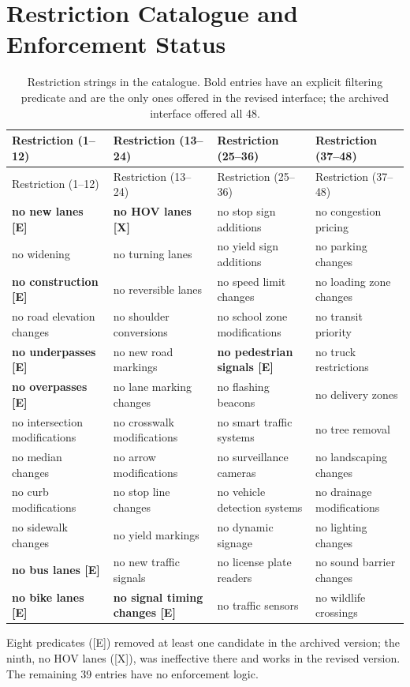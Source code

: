 \documentclass[11pt]{article}
\begin{document}
\section{Restriction Catalogue and Enforcement Status}
\begin{longtable}{P{0.21\textwidth} P{0.21\textwidth} P{0.21\textwidth} P{0.21\textwidth}}
\caption{Restriction strings in the catalogue. Bold entries have an explicit filtering predicate and are the only ones offered in the revised interface; the archived interface offered all 48.}\label{tab:restriction-catalogue}\\
\toprule Restriction (1--12) & Restriction (13--24) & Restriction (25--36) & Restriction (37--48) \\
\midrule
\endfirsthead
\toprule Restriction (1--12) & Restriction (13--24) & Restriction (25--36) & Restriction (37--48) \\
\midrule
\endhead
\textbf{no new lanes [E]} & \textbf{no HOV lanes [X]} & no stop sign additions & no congestion pricing \\
no widening & no turning lanes & no yield sign additions & no parking changes \\
\textbf{no construction [E]} & no reversible lanes & no speed limit changes & no loading zone changes \\
no road elevation changes & no shoulder conversions & no school zone modifications & no transit priority \\
\textbf{no underpasses [E]} & no new road markings & \textbf{no pedestrian signals [E]} & no truck restrictions \\
\textbf{no overpasses [E]} & no lane marking changes & no flashing beacons & no delivery zones \\
no intersection modifications & no crosswalk modifications & no smart traffic systems & no tree removal \\
no median changes & no arrow modifications & no surveillance cameras & no landscaping changes \\
no curb modifications & no stop line changes & no vehicle detection systems & no drainage modifications \\
no sidewalk changes & no yield markings & no dynamic signage & no lighting changes \\
\textbf{no bus lanes [E]} & no new traffic signals & no license plate readers & no sound barrier changes \\
\textbf{no bike lanes [E]} & \textbf{no signal timing changes [E]} & no traffic sensors & no wildlife crossings \\
\bottomrule
\end{longtable}
\noindent\footnotesize Eight predicates ([E]) removed at least one candidate in the archived version; the ninth, no HOV lanes ([X]), was ineffective there and works in the revised version. The remaining 39 entries have no enforcement logic.
\end{document}
